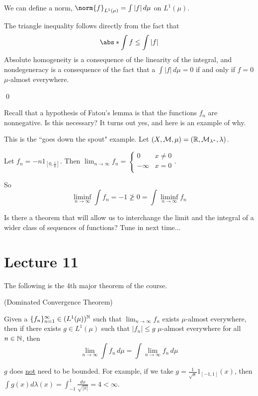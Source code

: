 \documentclass[x11names,reqno,14pt]{extarticle}
\newcommand*{\oo}{\infty}
\newcommand{\seq}[1]{_{#1 = 1}^\oo}
\begin{document}
\prop

We can define a norm, $\norm{f}_{L^1(\mu)} = \int|f|\,d\mu$ on $L^1(\mu)$. 

\proof

The triangle inequality follows directly from the fact that
\[
\abs*{\int f} \leq \int |f|
\]
Absolute homogeneity is a consequence of the linearity of the integral, and nondegeneracy is a consequence of the fact that a $\int |f|\,d\mu = 0$ if and only if $f = 0$ $\mu$-almost everywhere. 

\qed

Recall that a hypothesis of Fatou's lemma is that the functions $f_n$ are nonnegative. Is this necessary? It turns out yes, and here is an example of why.

\exm

This is the ``goes down the spout" example. Let $(X, \mathcal{M}, \mu) = (\mathbb{R}, \mathcal{M}_{\lambda^*}, \lambda)$. 

Let $f_n = -n1_{[0, \frac{1}{n}]}$. Then $\lim_{n\to\oo}f_n = \begin{cases} 0 & x\neq0 \\ -\oo & x = 0 \\ \end{cases}$. 

So
\[
\liminf_{n\to\oo}\int f_n = -1\not\geq 0 = \int\liminf_{n\to\oo}f_n
\]

Is there a theorem that will allow us to interchange the limit and the integral of a wider class of sequences of functions? Tune in next time...

\section*{Lecture 11}

The following is the 4th major theorem of the course.

\thm (Dominated Convergence Theorem)

Given a $\{f_n\}\seq{n} \in (L^1(\mu))^\N$ such that $\lim_{n\to\oo}f_n$ exists $\mu$-almost everywhere, then if there exists $g \in L^1(\mu)$ such that $|f_n| \leq g$ $\mu$-almost everywhere for all $n \in \mathbb{N}$, then
\[
\lim_{n\to\oo}\int f_n\,d\mu = \int\lim_{n\to\oo}f_n\,d\mu
\]

\proof 

\rem 

$g$ does \underline{not} need to be bounded. For example, if we take $g = \frac{1}{\sqrt{x}}1_{[-1, 1]}(x)$, then $\int g(x)d\lambda(x) = \int_{-1}^1\frac{dx}{\sqrt{|x|}} = 4 < \oo$. 
\end{document}
